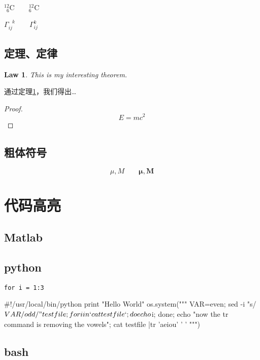 \documentclass[a4paper,12pt]{article}
\begin{document}
${}^{12}_{\phantom{1}6}\textrm{C} \qquad {}^{12}_{6}\textrm{C} $

$\Gamma_{ij}^{\phantom{ij}k} \qquad \Gamma_{ij}^{k} $ 

\subsection{定理、定律}

\newtheorem{law}{Law} %
\begin{law}\label{law:t} 
This is my interesting theorem.
\end{law}
通过定理\ref{law:t}，我们得出\ldots

\begin{proof}
\[E=mc^2\]
\end{proof}

\subsection{粗体符号}

\begin{displaymath}
\mu, M \qquad
\boldsymbol{\mu}, \boldsymbol{M}
\end{displaymath}

\section{代码高亮}

\subsection{Matlab}


\subsection{python}

\begin{lstlisting}
for i = 1:3
\end{lstlisting}

\begin{python}
#!/usr/local/bin/python
print "Hello World"
os.system("""
VAR=even;
sed -i "s/$VAR/odd/" testfile;
for i in `cat testfile` ;
do echo $i; done;
echo "now the tr command is removing the vowels";
cat testfile |tr 'aeiou' ' '
""") 
\end{python}

\subsection{bash}
\end{document}
